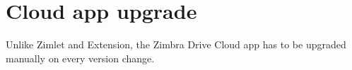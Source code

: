 \section{Cloud app upgrade}
Unlike Zimlet and Extension, the Zimbra Drive Cloud app has to be upgraded manually on every version change.
